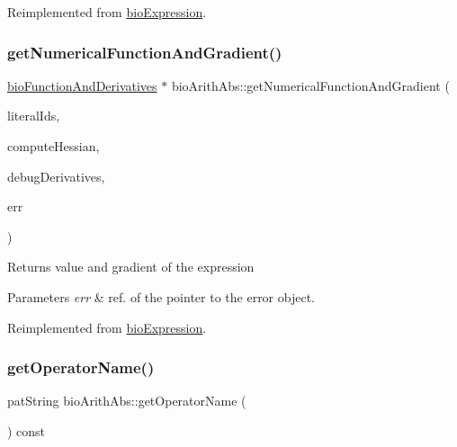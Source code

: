 Reimplemented from \hyperlink{classbio_expression_a3e4b4dca58dbbc6f0e411b30eb3f60b4}{bio\+Expression}.

\mbox{\label{classbio_arith_abs_a3fada6c065ad722d23499284ad14dac4}} 
\subsubsection{\texorpdfstring{get\+Numerical\+Function\+And\+Gradient()}{getNumericalFunctionAndGradient()}}
{\footnotesize\ttfamily \hyperlink{classbio_function_and_derivatives}{bio\+Function\+And\+Derivatives} $\ast$ bio\+Arith\+Abs\+::get\+Numerical\+Function\+And\+Gradient (\begin{DoxyParamCaption}\item[{vector$<$ pat\+U\+Long $>$}]{literal\+Ids,  }\item[{pat\+Boolean}]{compute\+Hessian,  }\item[{pat\+Boolean}]{debug\+Derivatives,  }\item[{pat\+Error $\ast$\&}]{err }\end{DoxyParamCaption})\hspace{0.3cm}{\ttfamily [virtual]}}

\begin{DoxyReturn}{Returns}
value and gradient of the expression 
\end{DoxyReturn}

\begin{DoxyParams}{Parameters}
{\em err} & ref. of the pointer to the error object. \\
\hline
\end{DoxyParams}


Reimplemented from \hyperlink{classbio_expression_a91c81ce80c9e972c913b10f5f3c1ed13}{bio\+Expression}.

\mbox{\label{classbio_arith_abs_ae3ec85c35e87b03dd5e4908e466252b3}} 
\subsubsection{\texorpdfstring{get\+Operator\+Name()}{getOperatorName()}}
{\footnotesize\ttfamily pat\+String bio\+Arith\+Abs\+::get\+Operator\+Name (\begin{DoxyParamCaption}{ }\end{DoxyParamCaption}) const\hspace{0.3cm}{\ttfamily [virtual]}}

